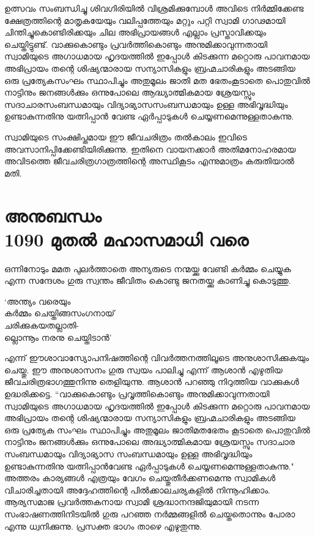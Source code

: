 \documentclass[12pt,openany]{book}
\newenvironment{myverse}
{\begin{quoting}[leftmargin=3em, rightmargin=3em, vskip=2ex, indentfirst=false, font=small]}
	{\end{quoting}}
\begin{document}
	ഉത്സവം സംബന്ധിച്ചു ശിവഗിരിയിൽ വിശ്രമിക്കുമ്പോൾ അവിടെ നിർമ്മിക്കേണ്ട ക്ഷേത്രത്തിന്റെ മാതൃകയേയും വലിപ്പത്തേയും മറ്റും പറ്റി സ്വാമി ഗാഢമായി ചിന്തിച്ചുകൊണ്ടിരിക്കയും ചില അഭിപ്രായങ്ങൾ എല്ലാം പ്രസ്താവിക്കയും ചെയ്തിട്ടുണ്ട്. വാക്കുകൊണ്ടും പ്രവർത്തികൊണ്ടും അനുമിക്കാവുന്നതായി സ്വാമിയുടെ അഗാധമായ ഹൃദയത്തിൽ ഇപ്പോൾ കിടക്കുന്ന മറ്റൊരു പാവനമായ അഭിപ്രായം തന്റെ ശിഷ്യന്മാരായ സന്യാസികളും ബ്രഹ്മചാരികളും അടങ്ങിയ ഒരു പ്രത്യേകസംഘം സ്ഥാപിച്ചും അതുമൂലം ജാതി മത ഭേതംകൂടാതെ പൊതുവിൽ നാട്ടിനും ജനങ്ങൾക്കും ഒന്നുപോലെ ആദ്ധ്യാത്മികമായ ശ്രേയസ്സും സദാചാരസംബന്ധമായും വിദ്യാഭ്യാസസംബന്ധമായും ഉള്ള അഭിവൃദ്ധിയും ഉണ്ടാകുന്നതിനു യത്നിപ്പാൻ വേണ്ട ഏർപ്പാടുകൾ ചെയ്യണമെന്നുള്ളതാകുന്നു.
	
	സ്വാമിയുടെ സംക്ഷിപ്തമായ ഈ ജീവചരിത്രം തൽകാലം ഇവിടെ അവസാനിപ്പിക്കേണ്ടിയിരിക്കുന്നു. ഇതിനെ വായനക്കാർ അതിമനോഹരമായ അവിടത്തെ ജീവചരിത്രഗാത്രത്തിന്റെ അസ്ഥികൂടം എന്നുമാത്രം കരുതിയാൽ മതി.
	
	\newpage
	\chapter*{{\large അനുബന്ധം}\\ 1090 മുതൽ മഹാസമാധി വരെ}
	
	ഒന്നിനോടും മമത പുലർത്താതെ അന്യരുടെ നന്മയ്ക്കു വേണ്ടി കർമ്മം ചെയ്യുക എന്ന സന്ദേശം ഗുരു സ്വന്തം ജീവിതം കൊണ്ടു ജനതയ്ക്കു കാണിച്ചു കൊടുത്തു.
	
	\begin{myverse}
		`അന്ത്യം വരെയും\\
		കർമ്മം ചെയ്തിങ്ങസംഗനായ്\\
		ചരിക്കുകയതല്ലാതി-\\
		ല്ലൊന്നൂം നരനു ചെയ്തിടാൻ'
	\end{myverse}
	
	എന്ന് ഈശാവാസ്യോപനിഷത്തിന്റെ വിവർത്തനത്തിലൂടെ അനുശാസിക്കുകയും ചെയ്തു. ഈ അനുശാസനം ഗുരു സ്വയം പാലിച്ചു എന്ന് ആശാൻ എഴുതിയ ജീവചരിത്രഭാഗത്തുനിന്നു തെളിയുന്നു. ആശാൻ പറഞ്ഞു നിറുത്തിയ വാക്കുകൾ ഉദ്ധരിക്കട്ടെ. ``വാക്കുകൊണ്ടും പ്രവൃത്തികൊണ്ടും അനുമിക്കാവുന്നതായി സ്വാമിയുടെ അഗാധമായ ഹൃദയത്തിൽ ഇപ്പോൾ കിടക്കുന്ന മറ്റൊരു പാവനമായ അഭിപ്രായം തന്റെ ശിഷ്യന്മാരായ സന്യാസികളും ബ്രഹ്മചാരികളും അടങ്ങിയ ഒരു പ്രത്യേക സംഘം സ്ഥാപിച്ചും അതുമൂലം ജാതിമതഭേതം കൂടാതെ പൊതുവിൽ നാട്ടിനും ജനങ്ങൾക്കും ഒന്നുപോലെ അദ്ധ്യാത്മികമായ ശ്രേയസ്സും സദാചാര സംബന്ധമായും വിദ്യാഭ്യാസ സംബന്ധമായും ഉള്ള അഭിവൃദ്ധിയും ഉണ്ടാകുന്നതിനു യത്നിപ്പാൻവേണ്ട ഏർപ്പാടുകൾ ചെയ്യണമെന്നുള്ളതാകുന്നു." അത്തരം കാര്യങ്ങൾ എത്രയും വേഗം ചെയ്തുതീർക്കണമെന്നു സ്വാമികൾ വിചാരിച്ചതായി അദ്ദേഹത്തിന്റെ പിൽക്കാലചര്യകളിൽ നിന്നൂഹിക്കാം. ആര്യസമാജ പ്രവർത്തകനായ സ്വാമി ശ്രദ്ധാനന്ദജിയുമായി നടന്ന സംഭാഷണത്തിനിടയിൽ ഗുരു പറഞ്ഞ നർമ്മങ്ങളിൽ ചെയ്തതൊന്നും പോരാ എന്നു ധ്വനിക്കുന്നു. പ്രസക്ത ഭാഗം താഴെ എഴുതുന്നു.
	
\end{document}
